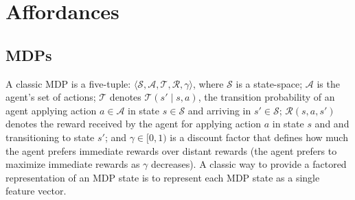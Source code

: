 \documentclass[conference]{IEEEtran}
\newcommand{\dnote}[1]{\textcolor{Green}{\textbf{D: #1}}}
\begin{document}



\section{Affordances}
\label{sec:affordances}

\subsection{MDPs}
A classic MDP is a
five-tuple: $\langle \mathcal{S}, \mathcal{A}, \mathcal{T},
\mathcal{R}, \gamma \rangle$, where $\mathcal{S}$ is a state-space;
$\mathcal{A}$ is the agent's set of actions; $\mathcal{T}$ denotes
$\mathcal{T}(s' \mid s,a)$, the transition probability of an agent
applying action $a \in \mathcal{A}$ in state $s \in \mathcal{S}$ and
arriving in $s' \in \mathcal{S}$; $\mathcal{R}(s,a,s')$ denotes the
reward received by the agent for applying action $a$ in state $s$ and
and transitioning to state $s'$; and $\gamma \in [0, 1)$ is a discount
  factor that defines how much the agent prefers immediate rewards
  over distant rewards (the agent prefers to maximize
  immediate rewards as $\gamma$ decreases). A classic way to provide a factored representation of an MDP state is to represent
each MDP state as a single feature vector. 
\end{document}
